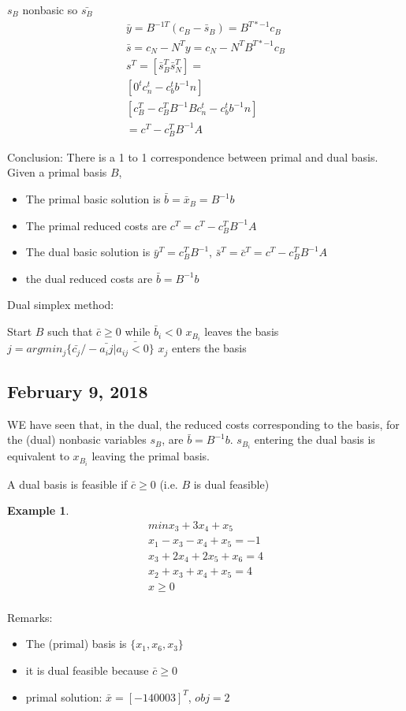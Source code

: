 \documentclass{article}
\theoremstyle{plain}
\theoremstyle{definition}
\newtheorem{eg}{Example}
\begin{document}
$s_B$ nonbasic so $\bar{s_B}$
\begin{align*}
    \bar{y} = B^{-1T} (c_B-\bar{s}_B) = B^{T*-1}c_B\\
    \bar{s} = c_N-N^{T}y = c_N - N^TB^{T*-1}c_B\\
    s^T = [ \bar{s}_B^T \bar{s}_N^T ] = \\
    [ 0^t c^t_n-c_b^tb^{-1}n ]\\
    [ c_B^T-c_B^TB^{-1}B  c^t_n-c_b^tb^{-1}n ]\\
    = c^T - c^T_BB^{-1}A
\end{align*}

Conclusion: There is a 1 to 1 correspondence between primal and dual basis.
Given a primal basis $B$,
\begin{itemize}
    \item The primal basic solution is $\bar{b} = \bar{x}_B = B^{-1}b$
    \item The primal reduced costs are $c^T = c^T - c^T_BB^{-1}A$
    \item The dual basic solution is $\bar{y}^T = c_B^TB^{-1}$,
        $\bar{s}^T = \bar{c}^T = c^T - c^T_BB^{-1}A$
    \item the dual reduced costs are $\bar{b} = B^{-1}b$
\end{itemize}

Dual simplex method:

Start $B$ such that $\bar{c}\geq 0$
while $\bar{b}_i < 0$
    $x_{B_i}$ leaves the basis
    $j = argmin_j \{\bar{c_j}/-\bar{a_ij} | \bar{a_{ij} < 0\}}$
    $x_j$ enters the basis

\subsection{February 9, 2018}
WE have seen that, in the dual, the reduced costs corresponding to the
basis, for the (dual) nonbasic variables $s_B$, are $\bar{b} = B^{-1}b$.
$s_{B_i}$ entering the dual basis is equivalent to $x_{B_i}$ leaving the
primal basis.

A dual basis is feasible if $\bar{c} \geq 0$ (i.e. $B$ is dual feasible)
\begin{eg}
    \begin{align*}
        min x_3 + 3x_4 + x_5\\
        x_1 - x_3 - x_4 + x_5 = -1\\
        x_3 + 2x_4 + 2x_5 + x_6 = 4\\
        x_2 + x_3 + x_4 + x_5 = 4\\
        x\geq 0\\
    \end{align*}
\end{eg}
Remarks:
\begin{itemize}
    \item The (primal) basis is $\{x_1, x_6, x_3\}$
    \item it is dual feasible because $\bar{c}\geq 0$
    \item primal solution: $\bar{x} = [-1 4 0 0 0 3]^T$, $obj = 2$
\end{itemize}
\end{document}
